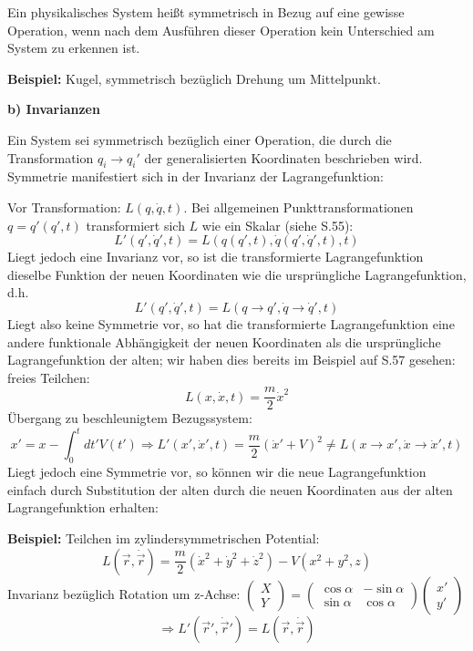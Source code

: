 \documentclass[10pt, letterpaper]{article}
\begin{document}
Ein physikalisches System heißt symmetrisch in Bezug auf eine gewisse Operation, wenn nach dem Ausführen dieser Operation kein Unterschied am System zu erkennen ist.

\textbf{Beispiel:} Kugel, symmetrisch bezüglich Drehung um Mittelpunkt.


\textbf{b) Invarianzen}

Ein System sei symmetrisch bezüglich einer Operation, die durch die Transformation $q_i \rightarrow q_i'$ der generalisierten Koordinaten beschrieben wird. Symmetrie manifestiert sich in der Invarianz der Lagrangefunktion:

Vor Transformation: $L(q,\dot{q},t)$. Bei allgemeinen Punkttransformationen $q = q'(q',t)$ transformiert sich $L$ wie ein Skalar (siehe S.55):
$$L'(q',\dot{q}',t) = L(q(q',t),\dot{q}(q',\dot{q}',t),t)$$
Liegt jedoch eine Invarianz vor, so ist die transformierte Lagrangefunktion dieselbe Funktion der neuen Koordinaten wie die ursprüngliche Lagrangefunktion, d.h.
$$L'(q',\dot{q}',t) = L(q\to q',\dot{q}\to\dot{q}',t)$$
Liegt also keine Symmetrie vor, so hat die transformierte Lagrangefunktion eine andere funktionale Abhängigkeit der neuen Koordinaten als die ursprüngliche Lagrangefunktion der alten; wir haben dies bereits im Beispiel auf S.57 gesehen: freies Teilchen: 
$$L(x,\dot{x},t) = \frac{m}{2}\dot{x}^2$$
Übergang zu beschleunigtem Bezugssystem: 
$$x' = x-\int_0^t dt' V(t') \Rightarrow L'(x',\dot{x}',t) = \frac{m}{2}(\dot{x}'+V)^2 \neq L(x\to x',\dot{x}\to\dot{x}',t)$$
Liegt jedoch eine Symmetrie vor, so können wir die neue Lagrangefunktion einfach durch Substitution der alten durch die neuen Koordinaten aus der alten Lagrangefunktion erhalten:




\textbf{Beispiel:} Teilchen im zylindersymmetrischen Potential:
$$L(\vec{r},\dot{\vec{r}}) = \frac{m}{2}(\dot{x}^2+\dot{y}^2+\dot{z}^2) - V(x^2+y^2,z)$$
Invarianz bezüglich Rotation um z-Achse: $\begin{pmatrix} X \\ Y \end{pmatrix} = \begin{pmatrix} \cos\alpha & -\sin\alpha \\ \sin\alpha & \cos\alpha \end{pmatrix} \begin{pmatrix} x' \\ y' \end{pmatrix}$
$$\Rightarrow L'(\vec{r}',\dot{\vec{r}}') = L(\vec{r},\dot{\vec{r}})$$
\end{document}
